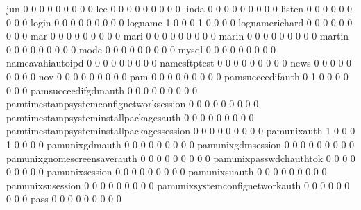 \documentclass[compress,8pt]{beamer}
\begin{document}
\begin{frame}
\begin{Schunk}
  jun                                        0   0   0   0   0   0   0   0   0
  lee                                        0   0   0   0   0   0   0   0   0
  linda                                      0   0   0   0   0   0   0   0   0
  listen                                     0   0   0   0   0   0   0   0   0
  login                                      0   0   0   0   0   0   0   0   0
  logname                                    1   0   0   0   1   0   0   0   0
  lognamerichard                             0   0   0   0   0   0   0   0   0
  mar                                        0   0   0   0   0   0   0   0   0
  mari                                       0   0   0   0   0   0   0   0   0
  marin                                      0   0   0   0   0   0   0   0   0
  martin                                     0   0   0   0   0   0   0   0   0
  mode                                       0   0   0   0   0   0   0   0   0
  mysql                                      0   0   0   0   0   0   0   0   0
  nameavahiautoipd                           0   0   0   0   0   0   0   0   0
  namesftptest                               0   0   0   0   0   0   0   0   0
  news                                       0   0   0   0   0   0   0   0   0
  nov                                        0   0   0   0   0   0   0   0   0
  pam                                        0   0   0   0   0   0   0   0   0
  pamsucceedifauth                           0   1   0   0   0   0   0   0   0
  pamsucceedifgdmauth                        0   0   0   0   0   0   0   0   0
  pamtimestampsystemconfignetworksession     0   0   0   0   0   0   0   0   0
  pamtimestampsysteminstallpackagesauth      0   0   0   0   0   0   0   0   0
  pamtimestampsysteminstallpackagessession   0   0   0   0   0   0   0   0   0
  pamunixauth                                1   0   0   0   1   0   0   0   0
  pamunixgdmauth                             0   0   0   0   0   0   0   0   0
  pamunixgdmsession                          0   0   0   0   0   0   0   0   0
  pamunixgnomescreensaverauth                0   0   0   0   0   0   0   0   0
  pamunixpasswdchauthtok                     0   0   0   0   0   0   0   0   0
  pamunixsession                             0   0   0   0   0   0   0   0   0
  pamunixsuauth                              0   0   0   0   0   0   0   0   0
  pamunixsusession                           0   0   0   0   0   0   0   0   0
  pamunixsystemconfignetworkauth             0   0   0   0   0   0   0   0   0
  pass                                       0   0   0   0   0   0   0   0   0

\end{Schunk}
\end{frame}
\end{document}
